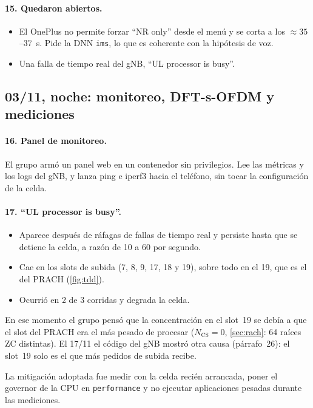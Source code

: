 \paragraph{15. Quedaron abiertos.}
\begin{itemize}
  \item El OnePlus no permite forzar ``NR only'' desde el menú y se corta a los $\approx 35$--37~s. Pide la DNN \texttt{ims}, lo que es coherente con la hipótesis de voz.
  \item Una falla de tiempo real del gNB, ``UL processor is busy''.
\end{itemize}

\subsection{03/11, noche: monitoreo, DFT-s-OFDM y mediciones}
\paragraph{16. Panel de monitoreo.} El grupo armó un panel web en un contenedor sin privilegios. Lee las métricas y los logs del gNB, y lanza ping e iperf3 hacia el teléfono, sin tocar la configuración de la celda.

\paragraph{17. ``UL processor is busy''.}
\begin{itemize}
  \item Aparece después de ráfagas de fallas de tiempo real y persiste hasta que se detiene la celda, a razón de 10 a 60 por segundo.
  \item Cae en los slots de subida (7, 8, 9, 17, 18 y 19), sobre todo en el 19, que es el del PRACH (\cref{fig:tdd}).
  \item Ocurrió en 2 de 3 corridas y degrada la celda.
\end{itemize}
En ese momento el grupo pensó que la concentración en el slot~19 se debía a que el slot del PRACH era el más pesado de procesar ($N_\text{CS}=0$, \cref{sec:rach}: 64 raíces ZC distintas). El 17/11 el código del gNB mostró otra causa (párrafo~26): el slot~19 solo es el que más pedidos de subida recibe.

La mitigación adoptada fue medir con la celda recién arrancada, poner el governor de la CPU en \texttt{performance} y no ejecutar aplicaciones pesadas durante las mediciones.

